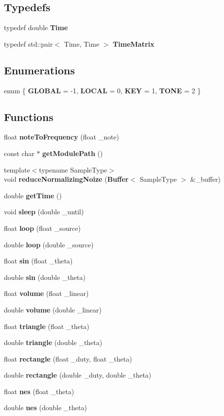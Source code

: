 \subsection*{Typedefs}
\begin{CompactItemize}
\item 
typedef double \textbf{Time}\label{namespaceharps_e436698398d387e2b89ecdc95171e7a7}

\item 
typedef std::pair$<$ Time, Time $>$ \textbf{TimeMatrix}\label{namespaceharps_e9707f612d7e353030e63165bc8796fc}

\end{CompactItemize}
\subsection*{Enumerations}
\begin{CompactItemize}
\item 
enum \{ \textbf{GLOBAL} =  -1, 
\textbf{LOCAL} =  0, 
\textbf{KEY} =  1, 
\textbf{TONE} =  2
 \}
\end{CompactItemize}
\subsection*{Functions}
\begin{CompactItemize}
\item 
float {\bf noteToFrequency} (float \_\-note)
\item 
const char $\ast$ {\bf getModulePath} ()
\item 
{\footnotesize template$<$typename SampleType$>$ }\\void {\bf reduceNormalizingNoize} ({\bf Buffer}$<$ SampleType $>$ \&\_\-buffer)
\item 
double {\bf getTime} ()
\item 
void {\bf sleep} (double \_\-until)
\item 
float {\bf loop} (float \_\-source)
\item 
double {\bf loop} (double \_\-source)
\item 
float {\bf sin} (float \_\-theta)
\item 
double {\bf sin} (double \_\-theta)
\item 
float {\bf volume} (float \_\-linear)
\item 
double {\bf volume} (double \_\-linear)
\item 
float {\bf triangle} (float \_\-theta)
\item 
double {\bf triangle} (double \_\-theta)
\item 
float {\bf rectangle} (float \_\-duty, float \_\-theta)
\item 
double {\bf rectangle} (double \_\-duty, double \_\-theta)
\item 
float {\bf nes} (float \_\-theta)
\item 
double {\bf nes} (double \_\-theta)
\end{CompactItemize}


